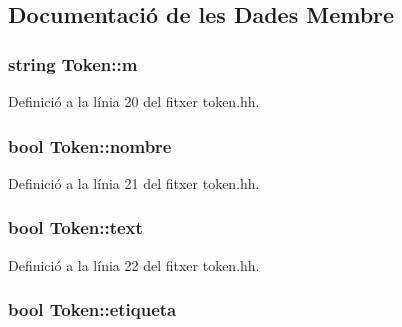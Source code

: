 \subsection{Documentació de les Dades Membre}
\hypertarget{class_token_a7ebc9777007c54f9a83d6197f3023d07}{}
\subsubsection[{m}]{\setlength{\rightskip}{0pt plus 5cm}string Token\+::m\hspace{0.3cm}{\ttfamily [private]}}\label{class_token_a7ebc9777007c54f9a83d6197f3023d07}


Definició a la línia 20 del fitxer token.\+hh.

\hypertarget{class_token_a3f8dba2b14d4e7b8d77ea608c286e62f}{}
\subsubsection[{nombre}]{\setlength{\rightskip}{0pt plus 5cm}bool Token\+::nombre\hspace{0.3cm}{\ttfamily [private]}}\label{class_token_a3f8dba2b14d4e7b8d77ea608c286e62f}


Definició a la línia 21 del fitxer token.\+hh.

\hypertarget{class_token_ad1f7addc8379df272399a71189a3d234}{}
\subsubsection[{text}]{\setlength{\rightskip}{0pt plus 5cm}bool Token\+::text\hspace{0.3cm}{\ttfamily [private]}}\label{class_token_ad1f7addc8379df272399a71189a3d234}


Definició a la línia 22 del fitxer token.\+hh.

\hypertarget{class_token_a7d8393d74f62678dca433bde9957ba8e}{}
\subsubsection[{etiqueta}]{\setlength{\rightskip}{0pt plus 5cm}bool Token\+::etiqueta\hspace{0.3cm}{\ttfamily [private]}}\label{class_token_a7d8393d74f62678dca433bde9957ba8e}


